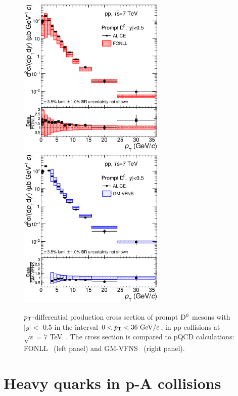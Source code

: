 \begin{figure}[!ht]
  \centering
  \includegraphics[width=7cm]{FigCap2/DzeroppCrossSecVsFONLLAndRatio.eps}
  \includegraphics[width=7cm]{FigCap2/DzeroppCrossSecVsGMVFNSAndRatio.eps}
  \caption{$p_{\rm T}$-differential production cross section of prompt ${\rm D^0}$ mesons with $|y| < $ 0.5 in the interval $0 < p_{\rm T} < 36 ~\mathrm{GeV}/c$, in pp collisions at $\sqrt{s} = 7$ TeV~\cite{Acharya:2017jgo}. The cross section is compared to pQCD calculations: FONLL~\cite{Cacciari:1998it,Cacciari:2001td} (left panel) and GM-VFNS~\cite{Kniehl:2004fy} (right panel).}
  \label{fig:CharmXsec}
\end{figure}

\section{Heavy quarks in p-A collisions}
\label{sec:HFpA}

